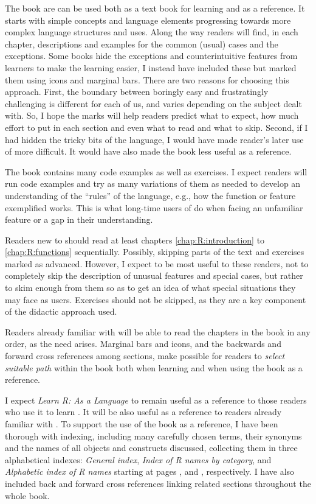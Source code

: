 \documentclass[krantz2]{krantz}\usepackage{knitr}
\begin{document}
The book are can be used both as a text book for learning \Rlang and as a reference. It starts with simple concepts and language elements progressing towards more complex language structures and uses. Along the way readers will find, in each chapter, descriptions and examples for the common (usual) cases and the exceptions. Some books hide the exceptions and counterintuitive features from learners to make the learning easier, I instead have included these but marked them using icons and marginal bars. There are two reasons for choosing this approach. First, the boundary between boringly easy and frustratingly challenging is different for each of us, and varies depending on the subject dealt with. So, I hope the marks will help readers predict what to expect, how much effort to put in each section and even what to read and what to skip. Second, if I had hidden the tricky bits of the \Rlang language, I would have made reader's later use of \Rlang more difficult. It would have also made the book less useful as a reference.

The book contains many code examples as well as exercises. I expect readers will run code examples and try as many variations of them as needed to develop an understanding of the ``rules'' of the \Rpgrm language, e.g., how the function or feature exemplified works. This is what long-time users of \Rlang do when facing an unfamiliar feature or a gap in their understanding.

Readers new to \Rlang should read at least chapters \ref{chap:R:introduction} to \ref{chap:R:functions} sequentially. Possibly, skipping parts of the text and exercises marked as advanced. However, I expect to be most useful to these readers, not to completely skip the description of unusual features and special cases, but rather to skim enough from them so as to get an idea of what special situations they may face as \Rlang users. Exercises should not be skipped, as they are a key component of the didactic approach used.

Readers already familiar with \Rlang will be able to read the chapters in the book in any order, as the need arises. Marginal bars and icons, and the backwards and forward cross references among sections, make possible for readers to \emph{select suitable path} within the book both when learning \Rlang and when using the book as a reference.

I expect \emph{Learn R: As a Language} to remain useful as a reference to those readers who use it to learn \Rlang. It will be also useful as a reference to readers already familiar with \Rlang. To support the use of the book as a reference, I have been thorough with indexing, including many carefully chosen terms, their synonyms and the names of all \Rlang objects and constructs discussed, collecting them in three alphabetical indexes: \emph{General index}, \emph{Index of R names by category}, and \emph{Alphabetic index of R names} starting at pages \pageref{idx:general}, \pageref{idx:rcats} and \pageref{idx:rindex}, respectively. I have also included back and forward cross references linking related sections throughout the whole book.
\end{document}
